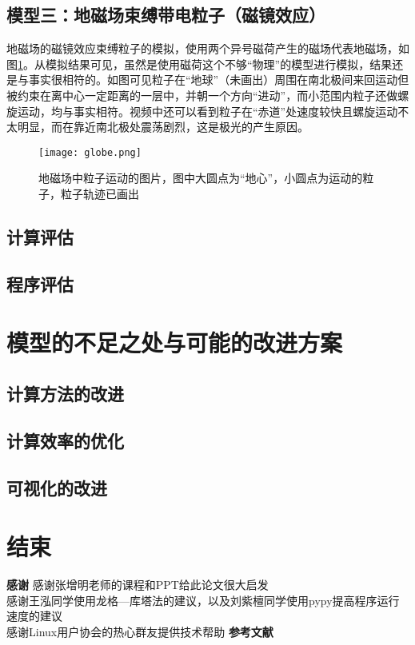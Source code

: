\documentclass[UTF-8,cs4size]{ctexart}
\begin{document}
\subsection{模型三：地磁场束缚带电粒子（磁镜效应）}
地磁场的磁镜效应束缚粒子的模拟，使用两个异号磁荷产生的磁场代表地磁场，如图\ref{fig:globe}。从模拟结果可见，虽然是使用磁荷这个不够“物理”的模型进行模拟，结果还是与事实很相符的。如图可见粒子在“地球”（未画出）周围在南北极间来回运动但被约束在离中心一定距离的一层中，并朝一个方向“进动”，而小范围内粒子还做螺旋运动，均与事实相符。视频中还可以看到粒子在“赤道”处速度较快且螺旋运动不太明显，而在靠近南北极处震荡剧烈，这是极光的产生原因。
\begin{figure}[h!]
	\centering
	\texttt{[image: globe.png]}
	\caption{地磁场中粒子运动的图片，图中大圆点为“地心”，小圆点为运动的粒子，粒子轨迹已画出}
	\label{fig:globe}
\end{figure}
\subsection{计算评估}
\subsection{程序评估}
\section{模型的不足之处与可能的改进方案}
\subsection{计算方法的改进}
\subsection{计算效率的优化}
\subsection{可视化的改进}
\section{结束}
\textbf{感谢}
感谢张增明老师的课程和PPT给此论文很大启发\\
感谢王泓同学使用龙格—库塔法的建议，以及刘紫檀同学使用pypy提高程序运行速度的建议\\
感谢Linux用户协会的热心群友提供技术帮助
\textbf{参考文献}
\end{document}
